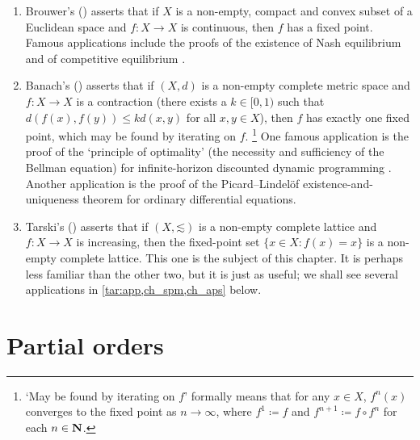 \begin{enumerate}

	\item \label{item:fpt_browuer} Brouwer's (\citeyear{Brouwer1912}) asserts that if $X$ is a non-empty, compact and convex subset of a Euclidean space and $f : X \to X$ is continuous, then $f$ has a fixed point. Famous applications include the proofs of the existence of Nash equilibrium \parencite{Nash1950,Nash1951} and of competitive equilibrium \parencite{Mckenzie1954,Mckenzie1959,ArrowDebreu1954}.

	\item \label{item:fpt_banach} Banach's (\citeyear{Banach1922}) asserts that if $(X,d)$ is a non-empty complete metric space and $f : X \to X$ is a contraction (there exists a $k \in [0,1)$ such that $d(f(x),f(y)) \leq k d(x,y)$ for all $x,y \in X$), then $f$ has exactly one fixed point, which may be found by iterating on $f$.%
		\footnote{`May be found by iterating on $f$' formally means that for any $x \in X$, $f^n(x)$ converges to the fixed point as $n \to \infty$, where $f^1 \coloneqq f$ and $f^{n+1} \coloneqq f \circ f^n$ for each $n \in \mathbf{N}$.}
	One famous application is the proof of the `principle of optimality' (the necessity and sufficiency of the Bellman equation) for infinite-horizon discounted dynamic programming \parencite{Blackwell1965}. Another application is the proof of the Picard--Lindelöf existence-and-uniqueness theorem for ordinary differential equations.

	\item \label{item:fpt_tarski} Tarski's (\citeyear{Tarski1955}) asserts that if $(X,\mathord{\lesssim})$ is a non-empty complete lattice and $f : X \to X$ is increasing, then the fixed-point set $\{ x \in X : f(x) = x \}$ is a non-empty complete lattice. This one is the subject of this chapter. It is perhaps less familiar than the other two, but it is just as useful; we shall see several applications in \cref{tar:app,ch_spm,ch_aps} below.

\end{enumerate}



\section{Partial orders}
\label{tar:poset}

